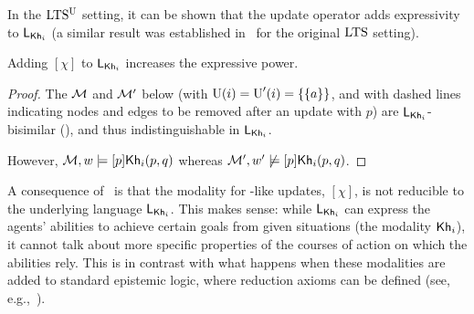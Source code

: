 \smallskip

In the $\textup{LTS$^\text{\textup{U}}$}$ setting, it can be shown that the update operator adds expressivity to $\mathsf{L}_{{\sf Kh}_i}$ (a similar result was established in~\cite{Wang2016} for the original $\textup{LTS}$ setting).

\medskip 

\begin{proposition}\label{prop:pal-exp}
Adding $[\chi]$ to $\mathsf{L}_{{\sf Kh}_i}$ increases the expressive power.
\end{proposition}

\begin{proof}
  The \ultss $\mathcal{M}$ and $\mathcal{M}'$ below (with $\operatorname{U}(i)=\operatorname{U}'(i)=\{ \{ a \} \}$, and with dashed lines indicating nodes and edges to be removed after an update with $p$) are $\mathsf{L}_{{\sf Kh}_i}$-bisimilar (), and thus indistinguishable in $\mathsf{L}_{{\sf Kh}_i}$. 
\begin{center}
  \end{center}
However, $\mathcal{M},w\models[p]{\sf Kh}_i(p,q)$ whereas
$\mathcal{M}',w'\not\models[p]{\sf Kh}_i(p,q)$.
\end{proof}

A consequence of~ is that the modality for \PAL-like updates, $[\chi]$, is not reducible to the underlying language $\mathsf{L}_{{\sf Kh}_i}$. This makes sense: while $\mathsf{L}_{{\sf Kh}_i}$ can express the agents' abilities to achieve certain goals from given situations (the modality ${\sf Kh}_i$), it cannot talk about more specific properties of the courses of action on which the abilities rely. This is in contrast with what happens when these modalities are added to standard epistemic logic, where reduction axioms can be defined (see, e.g.,~\cite{DELbook}).

